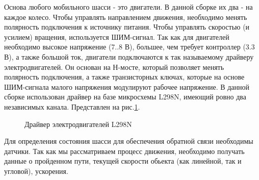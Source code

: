 \documentclass[14pt,a4paper,russian]{scrartcl}
\begin{document}
Основа любого мобильного шасси - это двигатели. В данной сборке их два - на каждое
колесо. Чтобы управлять направлением движения, необходимо менять полярность подключения
к источнику питания. Чтобы управлять скоростью (и усилием) вращения, используется
ШИМ-сигнал. Так как для двигателей необходимо высокое напряжение (7..8 В), большее,
чем требует контроллер (3.3 В), а также большой ток, двигатели подключаются
к так называемому драйверу электродвигателей. Он основан на Н-мосте, который позволяет
менять полярность подключения, а также транзисторных ключах, которые на основе ШИМ-сигнала
малого напряжения модулируют рабочее напряжение. В данной сборке использован драйвер
на базе микросхемы L298N, имеющий ровно два независимых канала. 
Представлен на рис.\ref{fig:motor_driver}.
\begin{figure}[h]
    \caption{Драйвер электродвигателей L298N}
    \label{fig:motor_driver}
\end{figure}

Для определения состояния шасси для обеспечения обратной связи
необходимы датчики. Так как мы рассматриваем процесс движения, 
необходимо получать данные о пройденном пути, текущей скорости обьекта (как 
линейной, так и угловой), ускорения. 
\end{document}
